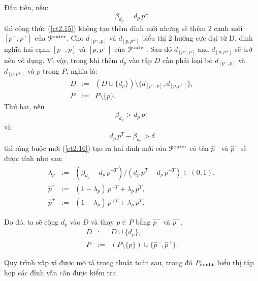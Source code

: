 \documentclass[12pt,a4paper,openany,oneside]{report}
\begin{document}
Đầu tiên, nếu:
\begin{equation}\label{ct2.17}
	\beta_{d_p} = d_p\, p^+
\end{equation}
thì công thức (\ref{ct2.15}) không tạo thêm đỉnh mới nhưng sẽ thêm 2 cạnh mới  $[p^-, p^+]$ của ${\cal P}^{\rm outer}$. Cho  $d_{[p^-, p]}$ và $d_{[p, p^+]}$ biểu thị 2 hướng cực đại từ D, định nghĩa hai cạnh $[p^-, p]$ và $[ p, p^+]$ của ${\cal P}^{\rm outer}$. Sau đó $d_{[p^-, p]}$ and $d_{[p, p^+]}$ sẽ trở nên vô dụng. Vì vậy, trong khi thêm $d_p$ vào tập $D$ cần phải loại bỏ $d_{[p^-, p]}$ và $d_{[p, p^+]}$ và $p$ trong $P$, nghĩa là:
\begin{equation}\label{ct2.18}
	\begin{array}{lcl}
		D &:=& (D \cup \{d_{p}\})\setminus \{d_{[p^-,p]}, d_{[p,p^+]}\}, \\
		P &:=& P \setminus \{p\}.
	\end{array}
\end{equation}
Thứ hai, nếu
\begin{equation}\label{ct2.19}
	\beta_{d_p} > d_p\, p^+
\end{equation}
và:
\begin{equation}\label{ct2.20}
	d_{p}\, p^T - \beta_{d_{p}} > \delta
\end{equation}
thì ràng buộc mới (\ref{ct2.16}) tạo ra hai đỉnh mới của ${\cal P}^{\rm outer}$ có tên $\hat p^-$ và $\hat p^+$ sẽ được tính như sau:
\begin{equation}\label{ct2.21}
	\begin{array}{lcl}
		\lambda_p &:=& (\beta_{d_p} - d_p\, p^{-T})/(d_p\, p^T - d_p\, p^{-T}) \in (0, 1), \\
		\hat p^- &:=& (1 - \lambda_p)\, p^{-T} + \lambda_p\, p^T, \\
		\hat p^+ &:=& (1 - \lambda_p)\, p^{+T} + \lambda_p\, p^T.
	\end{array}
\end{equation}

Do đó, ta sẽ cộng $d_p$ vào $D$ và thay $p \in P$ bằng $\hat p^-$ và $\hat p^+$.
\begin{equation}\label{ct2.22}
	\begin{array}{lcl}
		D &:=& D \cup \{d_{p}\}, \\
		P &:=&(P \setminus \{p\}) \cup \{\hat p^-, \hat p^+\}.
	\end{array}
\end{equation}

Quy trình xấp xỉ được mô tả trong thuật toán sau, trong đó $P_{\rm doubt}$ biểu thị tập hợp các đỉnh vẫn cần được kiểm tra.
\end{document}
